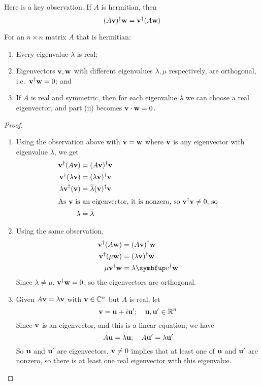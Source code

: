 Here is a key observation.
If \(A\) is hermitian, then
\[
	(A\vb v)^\dagger \vb w = \vb v^\dagger (A \vb w)
\]
\begin{theorem}
	For an \(n \times n\) matrix \(A\) that is hermitian:
	\begin{enumerate}
		\item Every eigenvalue \(\lambda\) is real;
		\item Eigenvectors \(\vb v, \vb w\) with different eigenvalues \(\lambda, \mu\) respectively, are orthogonal, i.e.\ \(\vb v^\dagger \vb w = 0\); and
		\item If \(A\) is real and symmetric, then for each eigenvalue \(\lambda\) we can choose a real eigenvector, and part (ii) becomes \(\vb v \cdot \vb w = 0\).
	\end{enumerate}
\end{theorem}
\begin{proof}
	\begin{enumerate}
		\item Using the observation above with \(\vb v = \vb w\) where \(\vb v\) is any eigenvector with eigenvalue \(\lambda\), we get
		      \begin{align*}
			      \vb v^\dagger (A\vb v)        & = (A\vb v)^\dagger \vb v                   \\
			      \vb v^\dagger (\lambda\vb v)  & = (\lambda\vb v)^\dagger \vb v             \\
			      \lambda \vb v^\dagger (\vb v) & = \overline{\lambda} (\vb v)^\dagger \vb v \\
			      \intertext{As \(\vb v\) is an eigenvector, it is nonzero, so \(\vb v^\dagger \vb v \neq 0\), so}
			      \lambda                       & = \overline \lambda
		      \end{align*}
		\item Using the same observation,
		      \begin{align*}
			      \vb v^\dagger (A \vb w)   & = (A \vb v)^\dagger \vb w       \\
			      \vb v^\dagger (\mu \vb w) & = (\lambda \vb v)^\dagger \vb w \\
			      \mu \vb v^\dagger \vb w   & = \lambda \bm v^\dagger \vb w
		      \end{align*}
		      Since \(\lambda \neq \mu\), \(\vb v^\dagger \vb w = 0\), so the eigenvectors are orthogonal.
		\item Given \(A\vb v = \lambda \vb v\) with \(\vb v \in \mathbb C^n\) but \(A\) is real, let
		      \[
			      \vb v = \vb u + i\vb u';\quad \vb u, \vb u' \in \mathbb R^n
		      \]
		      Since \(\vb v\) is an eigenvector, and this is a linear equation, we have
		      \[
			      A\vb u = \lambda \vb u;\quad A\vb u' = \lambda \vb u'
		      \]
		      So \(\vb u\) and \(\vb u'\) are eigenvectors.
		      \(\vb v \neq 0\) implies that at least one of \(\vb u\) and \(\vb u'\) are nonzero, so there is at least one real eigenvector with this eigenvalue.
	\end{enumerate}
\end{proof}
